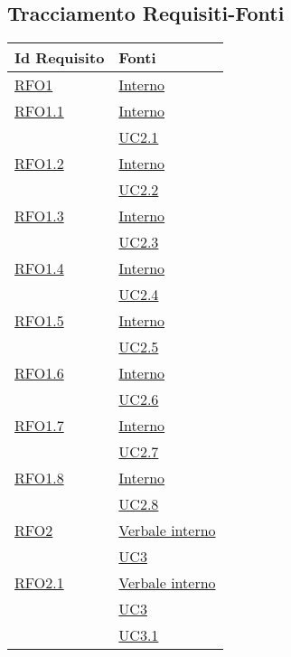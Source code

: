 \subsection{Tracciamento Requisiti-Fonti}
\normalsize
\begin{longtable}{|>{\centering}m{5cm}|m{5cm}<{\centering}|}
\hline 
\textbf{Id Requisito} & \textbf{Fonti}\\
\hline
\endhead
\hyperlink{RFO1}{RFO1} & \hyperlink{Interno}{Interno}\\ \hline

\hyperlink{RFO1.1}{RFO1.1} & \hyperlink{Interno}{Interno}\\
& \hyperref[UC2.1]{UC2.1}\\ \hline

\hyperlink{RFO1.2}{RFO1.2} & \hyperlink{Interno}{Interno}\\
& \hyperref[UC2.2]{UC2.2}\\ \hline

\hyperlink{RFO1.3}{RFO1.3} & \hyperlink{Interno}{Interno}\\
& \hyperref[UC2.3]{UC2.3}\\ \hline

\hyperlink{RFO1.4}{RFO1.4} & \hyperlink{Interno}{Interno}\\
& \hyperref[UC2.4]{UC2.4}\\ \hline

\hyperlink{RFO1.5}{RFO1.5} & \hyperlink{Interno}{Interno}\\
& \hyperref[UC2.5]{UC2.5}\\ \hline

\hyperlink{RFO1.6}{RFO1.6} & \hyperlink{Interno}{Interno}\\
& \hyperref[UC2.6]{UC2.6}\\ \hline

\hyperlink{RFO1.7}{RFO1.7} & \hyperlink{Interno}{Interno}\\
& \hyperref[UC2.7]{UC2.7}\\ \hline

\hyperlink{RFO1.8}{RFO1.8} & \hyperlink{Interno}{Interno}\\
& \hyperref[UC2.8]{UC2.8}\\ \hline

\hyperlink{RFO2}{RFO2} & \hyperlink{Verbale interno}{Verbale interno}\\
& \hyperref[UC3]{UC3}\\ \hline

\hyperlink{RFO2.1}{RFO2.1} & \hyperlink{Verbale interno}{Verbale interno}\\
& \hyperref[UC3]{UC3}\\
& \hyperref[UC3.1]{UC3.1}\\ \hline


\end{longtable}
